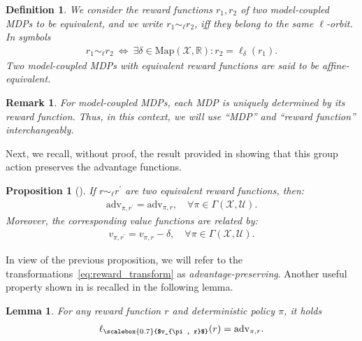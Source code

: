 \documentclass[10pt,leqno]{amsart}
\newcommand{\sml}{\scriptscriptstyle}
\newcommand{\R}{\mathbb{R}}
\newcommand{\U}{\mathcal{U}}
\newcommand{\X}{\mathcal{X}}
\newcommand{\cost}{r}
\newcommand{\vv}{v_{\policy, \cost}}
\newcommand{\vvarg}[1]{v_{#1}}
\newcommand{\policy}{\pi}
\newcommand{\Sect}{\Gamma(\X, \U)}
\newcommand{\maps}{\text{Map}}
\newcommand{\actAdvsym}{\ell}
\newcommand{\actAdv}[1]{\actAdvsym_{#1}}
\newcommand{\advsym}{\text{adv}}
\newcommand{\adv}[2]{\advsym_{#1, #2}}
\newcommand{\eqrel}{\sim_{\sml \!\actAdvsym}}
\newtheorem{definition}[theorem]{Definition}
\newtheorem{lemma}[theorem]{Lemma}
\newtheorem{proposition}[theorem]{Proposition}
\newtheorem{remark}[theorem]{Remark}
\begin{document}
\begin{definition}
    We consider the reward functions $\cost_1, \cost_2$ of two model-coupled MDPs to be equivalent, and we write $\cost_1 \eqrel \cost_2$, iff they belong to the same $\actAdvsym$-orbit. In symbols 
    \begin{align*}
        \cost_1 \eqrel \cost_2 ~\Longleftrightarrow~ \exists \delta \in \maps(\X, \R) : \cost_2 = \actAdv{\delta}(\cost_1).
    \end{align*}
    Two model-coupled MDPs with equivalent reward functions are said to be affine-equivalent.
\end{definition}
\begin{remark}
    For model-coupled MDPs, each MDP is uniquely determined by its reward function. Thus, in this context, we will use ``MDP'' and ``reward function'' interchangeably.
\end{remark}
\noindent
Next, we recall, without proof, the result provided in \cite{mustafin2025mdpgeometrynormalizationreward} showing that this group action preserves the advantage functions.
\begin{proposition}[{\cite[Theorem 3.5]{mustafin2025mdpgeometrynormalizationreward}}]\label{lem:advantage_preservation}
    If $\cost \eqrel \cost^\prime$ are two equivalent reward functions, then:
    \begin{align*}
        \adv{\policy}{\cost^\prime} = \adv{\policy}{\cost}, \quad \forall \policy \in \Sect.
    \end{align*}
    Moreover, the corresponding value functions are related by:
    \begin{align*}
        \vvarg{\policy, \cost^\prime} = \vv - \delta, \quad \forall \policy \in \Sect.
    \end{align*}
\end{proposition}
\noindent
In view of the previous proposition, we will refer to the transformations~\eqref{eq:reward_transform} as \emph{advantage-preserving}. Another useful property shown in \cite{mustafin2025mdpgeometrynormalizationreward} is recalled in the following lemma.
\begin{lemma}\label{lem:transform_as_advantage}
    For any reward function $\cost$ and deterministic policy $\policy$, it holds
    \vspace{-0.2cm}
    \begin{align*}
        \actAdv{\scalebox{0.7}{$\vv$}}(\cost) = \adv{\policy}{\cost}.
    \end{align*}
\end{lemma}
\end{document}
